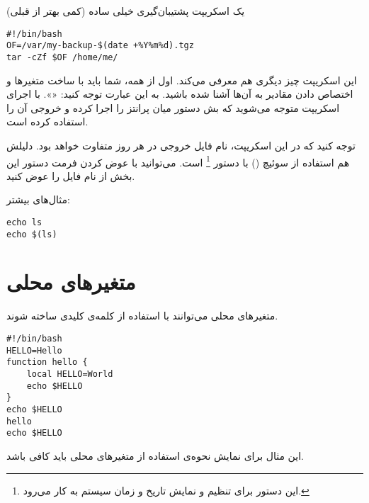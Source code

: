 \begin{example}{یک اسکریپت پشتیبان‌گیری خیلی ساده (کمی بهتر از قبلی)}
\begin{latin}
\begin{lstlisting}
#!/bin/bash
OF=/var/my-backup-$(date +%Y%m%d).tgz
tar -cZf $OF /home/me/
\end{lstlisting}
\end{latin}

این اسکریپت چیز دیگری هم معرفی می‌کند‌. اول از همه‌، شما باید با ساخت متغیر‌ها و
اختصاص دادن مقادیر به آن‌ها آشنا شده باشید‌. به این عبارت توجه کنید:
«».
با اجرای اسکریپت متوجه می‌شوید که بش دستور میان پرانتز را اجرا کرده و خروجی آن را
استفاده کرده است.

توجه کنید که در این اسکریپت، نام فایل خروجی در هر روز متفاوت خواهد بود. دلیلش هم
استفاده از سوئیچ
()
  با دستور
\footnote{این دستور برای تنظیم و نمایش تاریخ و زمان سیستم به کار می‌رود.}
 است. می‌توانید ‌با عوض کردن فرمت دستور
 این بخش از نام فایل را عوض کنید.
\end{example}

مثال‌های بیشتر:
\begin{latin}
\begin{lstlisting}
echo ls
echo $(ls)
\end{lstlisting}
\end{latin}

\section*{متغیرهای محلی}
متغیرهای محلی می‌توانند با استفاده از کلمه‌ی کلیدی  ساخته شوند.
\begin{latin}
\begin{lstlisting}
#!/bin/bash
HELLO=Hello
function hello {
	local HELLO=World
	echo $HELLO
}
echo $HELLO
hello
echo $HELLO
\end{lstlisting}
\end{latin}

این مثال برای نمایش نحوه‌ی استفاده از متغیرهای محلی باید کافی باشد.
